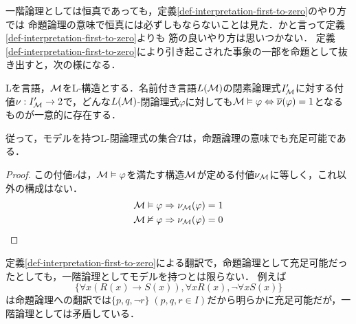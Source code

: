 \documentclass[uplatex, 12pt, dvipdfmx]{jsreport}
\begin{document}
一階論理としては恒真であっても，定義\ref{def-interpretation-first-to-zero}のやり方では
命題論理の意味で恒真には必ずしもならないことは見た．かと言って定義\ref{def-interpretation-first-to-zero}よりも
筋の良いやり方は思いつかない．
定義\ref{def-interpretation-first-to-zero}により引き起こされた事象の一部を命題として抜き出すと，次の様になる．

\begin{lemma}
    Lを言語，$\mathcal{M}$をL-構造とする．名前付き言語$L(\mathcal{M})$の閉素論理式$I'_{\mathcal{M}}$に対する付値$\nu:I'_{\mathcal{M}}\to 2$で，どんな$L(\mathcal{M})$-閉論理式$\varphi$に対しても$\mathcal{M}\vDash\varphi\Leftrightarrow\overline{\nu}(\varphi)=1$となるものが一意的に存在する．

    従って，モデルを持つL-閉論理式の集合$T$は，命題論理の意味でも充足可能である．
\end{lemma}
\begin{proof}
    この付値$\nu$は，$\mathcal{M}\vDash\varphi$を満たす構造$\mathcal{M}$が定める付値$\nu_{\mathcal{M}}$に等しく，これ以外の構成はない．
    \begin{align*}
        \mathcal{M}\vDash\varphi&\Rightarrow\nu_{\mathcal{M}}(\varphi)=1\\
        \mathcal{M}\nvDash\varphi&\Rightarrow\nu_{\mathcal{M}}(\varphi)=0
    \end{align*}
\end{proof}
\begin{remark}[逆の反例]
    定義\ref{def-interpretation-first-to-zero}による翻訳で，命題論理として充足可能だったとしても，一階論理としてモデルを持つとは限らない．
    例えば\[\{\forall x(R(x)\to S(x)),\forall xR(x),\lnot\forall xS(x)\}\]
    は命題論理への翻訳では$\{p,q,\lnot r\}\;(p,q,r\in I)$だから明らかに充足可能だが，一階論理としては矛盾している．
\end{remark}
\end{document}
